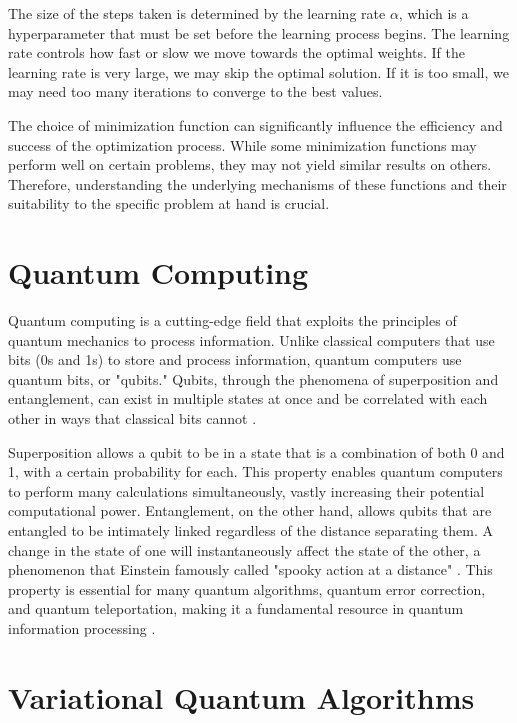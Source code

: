 \documentclass[
  a4paper,  %
  twoside,  %
  bibliography=totoc,
  headsepline,
  cleardoublepage=empty,
  parskip=half,
  draft=false
]{scrbook}
\begin{document}
The size of the steps taken is determined by the learning rate \(\alpha\), which is a hyperparameter that must be set before the learning process begins.
The learning rate controls how fast or slow we move towards the optimal weights.
If the learning rate is very large, we may skip the optimal solution.
If it is too small, we may need too many iterations to converge to the best values.

The choice of minimization function can significantly influence the efficiency and success of the optimization process.
While some minimization functions may perform well on certain problems, they may not yield similar results on others.
Therefore, understanding the underlying mechanisms of these functions and their suitability to the specific problem at hand is crucial.

\section{Quantum Computing}
\label{sec:quantumComputing}
Quantum computing is a cutting-edge field that exploits the principles of quantum mechanics to process information.
Unlike classical computers that use bits (0s and 1s) to store and process information, quantum computers use quantum bits, or "qubits."
Qubits, through the phenomena of superposition and entanglement, can exist in multiple states at once and be correlated with each other in ways that classical bits cannot \cite{Nielsen2010}.

Superposition allows a qubit to be in a state that is a combination of both 0 and 1, with a certain probability for each.
This property enables quantum computers to perform many calculations simultaneously, vastly increasing their potential computational power.
Entanglement, on the other hand, allows qubits that are entangled to be intimately linked regardless of the distance separating them.
A change in the state of one will instantaneously affect the state of the other, a phenomenon that Einstein famously called "spooky action at a distance" \cite{Einstein1935}.
This property is essential for many quantum algorithms, quantum error correction, and quantum teleportation, making it a fundamental resource in quantum information processing \cite{Nielsen2010,Preskill1998}.


\section{Variational Quantum Algorithms}
\label{sec:variationalQuantumAlgorithms}
\end{document}
